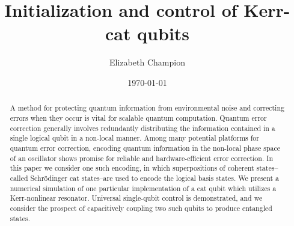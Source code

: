 \documentclass[a4paper, amsfonts, amssymb, amsmath, reprint, showkeys, nofootinbib, twoside]{revtex4-1}
\begin{document}
\title{Initialization and control of Kerr-cat qubits}

\author{Elizabeth Champion}

\date{\today} %

\begin{abstract}
    \noindent A method for protecting quantum information from environmental noise and correcting errors when they occur is vital for scalable quantum computation.
    Quantum error correction generally involves redundantly distributing the information contained in a single logical qubit in a non-local manner.
    Among many potential platforms for quantum error correction, encoding quantum information in the non-local phase space of an oscillator shows promise for reliable and hardware-efficient error correction.
    In this paper we consider one such encoding, in which superpositions of coherent states--called Schr\"odinger cat states--are used to encode the logical basis states.
    We present a numerical simulation of one particular implementation of a cat qubit which utilizes a Kerr-nonlinear resonator.
    Universal single-qubit control is demonstrated, and we consider the prospect of capacitively coupling two such qubits to produce entangled states.
\end{abstract}


\maketitle






\end{document}
